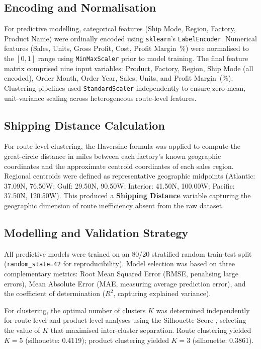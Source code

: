 \documentclass[12pt, a4paper]{article}
\begin{document}
\subsection{Encoding and Normalisation}

For predictive modelling, categorical features (Ship Mode, Region, Factory,
Product Name) were ordinally encoded using \texttt{sklearn}'s
\texttt{LabelEncoder}. Numerical features (Sales, Units, Gross Profit, Cost,
Profit Margin~\%) were normalised to the $[0,1]$ range using
\texttt{MinMaxScaler} prior to model training. The final feature matrix
comprised nine input variables: Product, Factory, Region, Ship Mode
(all encoded), Order Month, Order Year, Sales, Units, and Profit Margin~(\%).
Clustering pipelines used \texttt{StandardScaler} independently to ensure
zero-mean, unit-variance scaling across heterogeneous route-level features.

\subsection{Shipping Distance Calculation}
\label{subsec:distance}

For route-level clustering, the Haversine formula \citep{sinnott1984} was
applied to compute the great-circle distance in miles between each factory's
known geographic coordinates and the approximate centroid coordinates of each
sales region. Regional centroids were defined as representative geographic
midpoints (Atlantic: 37.09\textdegree N, 76.50\textdegree W;
Gulf: 29.50\textdegree N, 90.50\textdegree W;
Interior: 41.50\textdegree N, 100.00\textdegree W;
Pacific: 37.50\textdegree N, 120.50\textdegree W).
This produced a \textbf{Shipping Distance} variable capturing the
geographic dimension of route inefficiency absent from the raw dataset.

\subsection{Modelling and Validation Strategy}

All predictive models were trained on an 80/20 stratified random
train-test split (\texttt{random\_state=42} for reproducibility).
Model selection was based on three complementary metrics: Root Mean
Squared Error (RMSE, penalising large errors), Mean Absolute Error
(MAE, measuring average prediction error), and the coefficient of
determination ($R^2$, capturing explained variance).

For clustering, the optimal number of clusters $K$ was determined
independently for route-level and product-level analyses using the
Silhouette Score \citep{rousseeuw1987}, selecting the value of $K$
that maximised inter-cluster separation. Route clustering yielded $K=5$
(silhouette: 0.4119); product clustering yielded $K=3$ (silhouette: 0.3861).
\end{document}
